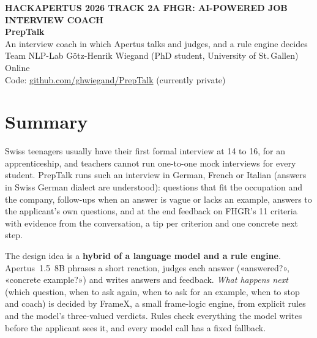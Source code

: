 \documentclass[10pt,a4paper]{article}
\newcommand{\repository}{\href{https://github.com/ghwiegand/PrepTalk}{github.com/ghwiegand/PrepTalk}}
\newcommand{\videolink}{} %
\begin{document}
\begin{tcolorbox}[enhanced,colback=navy,colframe=navy,arc=0pt,boxrule=0pt,left=14pt,right=14pt,top=12pt,bottom=12pt,
  coltext=white,width=\textwidth]
{\sffamily\bfseries\footnotesize\color{rust!60!white}HACKAPERTUS 2026 \textperiodcentered{} TRACK 2A \textperiodcentered{} FHGR: AI-POWERED JOB INTERVIEW COACH}\\[6pt]
{\fontsize{24}{28}\selectfont\bfseries PrepTalk}\\[3pt]
{\large An interview coach in which Apertus talks and judges, and a rule engine decides}\\[8pt]
{\sffamily\small Team NLP-Lab \textperiodcentered{} Götz-Henrik Wiegand (PhD student, University of St.\,Gallen) \textperiodcentered{} Online\\[2pt]
Code: \repository{} (currently private)\ifdefempty{\videolink}{}{ \textperiodcentered{} Demo: \videolink{}}}
\end{tcolorbox}

\vspace{2pt}
\section*{Summary}
Swiss teenagers usually have their first formal interview at 14 to 16, for an apprenticeship, and teachers cannot
run one-to-one mock interviews for every student. PrepTalk runs such an interview in German, French or Italian
(answers in Swiss German dialect are understood): questions that fit the occupation and the company, follow-ups when an answer is vague
or lacks an example, answers to the applicant's own questions, and at the end feedback on FHGR's 11 criteria with
evidence from the conversation, a tip per criterion and one concrete next step.

The design idea is a \textbf{hybrid of a language model and a rule engine}. Apertus~1.5~8B phrases a short reaction,
judges each answer («answered?», «concrete example?») and writes answers and feedback. \emph{What happens next}
(which question, when to ask again, when to ask for an example, when to stop and coach) is decided by FrameX, a small
frame-logic engine, from explicit rules and the model's three-valued verdicts. Rules check everything the model writes before the
applicant sees it, and every model call has a fixed fallback.
\end{document}
